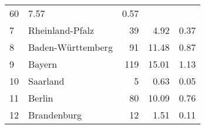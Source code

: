 \begin{longtable}{lXrrr}
       \num{60} &
       \num[round-mode=places,round-precision=2]{7.57} &
         \num[round-mode=places,round-precision=2]{0.57} \\

     7 &
     \multicolumn{1}{X}{ Rheinland-Pfalz   } &


       \num{39} &
       \num[round-mode=places,round-precision=2]{4.92} &
         \num[round-mode=places,round-precision=2]{0.37} \\

     8 &
     \multicolumn{1}{X}{ Baden-Württemberg   } &


       \num{91} &
       \num[round-mode=places,round-precision=2]{11.48} &
         \num[round-mode=places,round-precision=2]{0.87} \\

     9 &
     \multicolumn{1}{X}{ Bayern   } &


       \num{119} &
       \num[round-mode=places,round-precision=2]{15.01} &
         \num[round-mode=places,round-precision=2]{1.13} \\

     10 &
     \multicolumn{1}{X}{ Saarland   } &


       \num{5} &
       \num[round-mode=places,round-precision=2]{0.63} &
         \num[round-mode=places,round-precision=2]{0.05} \\

     11 &
     \multicolumn{1}{X}{ Berlin   } &


       \num{80} &
       \num[round-mode=places,round-precision=2]{10.09} &
         \num[round-mode=places,round-precision=2]{0.76} \\

     12 &
     \multicolumn{1}{X}{ Brandenburg   } &


       \num{12} &
       \num[round-mode=places,round-precision=2]{1.51} &
         \num[round-mode=places,round-precision=2]{0.11} \\


\end{longtable}
